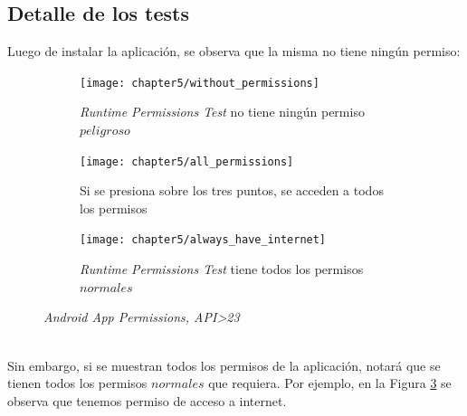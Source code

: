 \subsection*{Detalle de los tests}
Luego de instalar la aplicación, se observa que la misma no tiene ningún permiso:
\begin{figure}[!ht]
	\centering
	\begin{subfigure}{.32\textwidth}
		\texttt{[image: chapter5/without\_permissions]}
		\caption{\textit{Runtime Permissions Test} no tiene ningún permiso $peligroso$}
		\label{fig:chapter05:without_permissions}
	\end{subfigure}
	\begin{subfigure}{.32\textwidth}
		\texttt{[image: chapter5/all\_permissions]}
		\caption{Si se presiona sobre los tres puntos, se acceden a todos los permisos}
		\label{fig:chapter05:all_permissions}
	\end{subfigure}
	\begin{subfigure}{.32\textwidth}
		\texttt{[image: chapter5/always\_have\_internet]}
		\caption{\textit{Runtime Permissions Test} tiene todos los permisos $normales$}
		\label{fig:chapter05:always_have_internet}
	\end{subfigure}
	\caption{\textit{Android App Permissions, API\textgreater 23}}
	\label{fig:chapter05:android_permissions}
\end{figure}\\
Sin embargo, si se muestran todos los permisos de la aplicación, notará que se tienen todos los permisos $normales$ que requiera. Por ejemplo, en la Figura \ref{fig:chapter05:always_have_internet} se observa que tenemos permiso de acceso a internet.